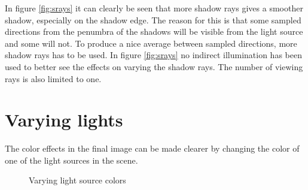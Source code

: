 \documentclass[a4paper]{report}
\begin{document}
In figure \ref{fig:srays} it can clearly be seen that more shadow rays gives
a smoother shadow, especially on the shadow edge. The reason for this
is that some sampled directions from the penumbra of the shadows will
be visible from the light source and some will not. To produce a nice
average between sampled directions, more shadow rays has to be
used. In figure \ref{fig:srays} no indirect illumination has been used
to better see the effects on varying the shadow rays. The number of
viewing rays is also limited to one.

\pagebreak

\section{Varying lights}

The color effects in the final image can be made clearer by changing
the color of one of the light sources in the scene.

\begin{figure}[h]
  \centering
  \caption{Varying light source colors}
  \label{fig:lightcolor}
\end{figure}
\end{document}
